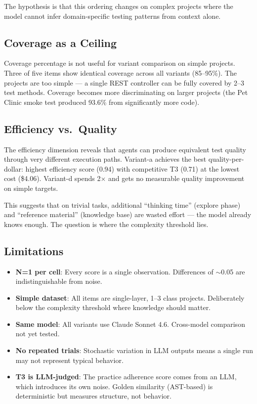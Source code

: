 \documentclass[11pt,a4paper]{article}
\begin{document}
The hypothesis is that this ordering changes on complex projects where the
model cannot infer domain-specific testing patterns from context alone.

\subsection{Coverage as a Ceiling}

Coverage percentage is not useful for variant comparison on simple projects.
Three of five items show identical coverage across all variants (85--95\%).
The projects are too simple --- a single REST controller can be fully covered
by 2--3 test methods. Coverage becomes more discriminating on larger projects
(the Pet Clinic smoke test produced 93.6\% from significantly more code).

\subsection{Efficiency vs.\ Quality}

The efficiency dimension reveals that agents can produce equivalent test quality
through very different execution paths. Variant-a achieves the best
quality-per-dollar: highest efficiency score (0.94) with competitive T3 (0.71)
at the lowest cost (\$4.06). Variant-d spends 2$\times$ and gets no measurable
quality improvement on simple targets.

This suggests that on trivial tasks, additional ``thinking time'' (explore phase)
and ``reference material'' (knowledge base) are wasted effort --- the model already
knows enough. The question is where the complexity threshold lies.

\subsection{Limitations}

\begin{itemize}
  \item \textbf{N=1 per cell}: Every score is a single observation. Differences of $\sim$0.05 are indistinguishable from noise.
  \item \textbf{Simple dataset}: All items are single-layer, 1--3 class projects. Deliberately below the complexity threshold where knowledge should matter.
  \item \textbf{Same model}: All variants use Claude Sonnet 4.6. Cross-model comparison not yet tested.
  \item \textbf{No repeated trials}: Stochastic variation in LLM outputs means a single run may not represent typical behavior.
  \item \textbf{T3 is LLM-judged}: The practice adherence score comes from an LLM, which introduces its own noise. Golden similarity (AST-based) is deterministic but measures structure, not behavior.
\end{itemize}
\end{document}
